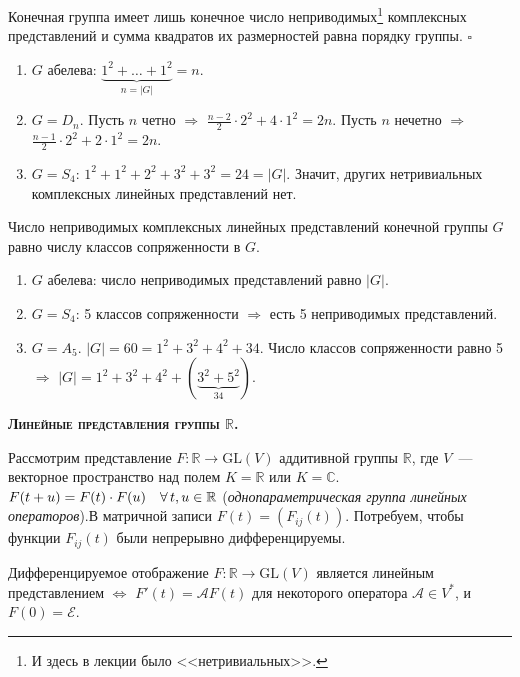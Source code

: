 \documentclass[a4paper]{article}
\newcommand*{\tema}[1]{\vspace{20pt}
\begin{center}{\textbf{\textsc{#1.}}}\vspace{5pt}
\end{center}}
\newcommand*{\p}[1]{#1\nobreak\discretionary{}{\hbox{$\mathsurround=0pt #1$}}{}}
\begin{document}
\begin{sled}
Конечная группа имеет лишь конечное число неп\-риводимых\footnote{И
здесь в лекции было <<нетривиальных>>.} комплексных представлений и
сумма квадратов их размерностей равна порядку группы. $\square$
\end{sled}

\prim
\begin{enumerate}
  \item $G$ абелева: $\underbrace{1^2+\ldots+1^2}_{n=|G|}=n$.
  \item $G=D_n$. Пусть $n$ четно $\Rightarrow$ $\frac{n-2}{2}\cdot 2^2+4\cdot
  1^2=2n$. Пусть $n$ нечетно $\Rightarrow$ $\frac{n-1}{2}\cdot 2^2+2\cdot
  1^2=2n$.
  \item $G=S_4$: $1^2+1^2+2^2+3^2+3^2=24=|G|$. Значит, других
  нетривиальных комплексных линейных представлений нет.
\end{enumerate}

\begin{theorem}
Число неприводимых комплексных линейных представлений конечной
группы $G$ равно числу классов сопряженности в $G$.
\end{theorem}

\prim
\begin{enumerate}
  \item $G$ абелева: число неприводимых представлений равно $|G|$.
  \item $G=S_4$: 5 классов сопряженности $\Rightarrow$ есть 5
  неприводимых представлений.
  \item $G=A_5$. $|G|=60=1^2+3^2+4^2+34$. Число классов
  сопряженности равно 5 $\Rightarrow$
  $|G|=1^2+3^2+4^2+(\underbrace{3^2+5^2}_{34})$.
\end{enumerate}

\tema{Линейные представления группы $\mathbb{R}$}

Рассмотрим представление $F\colon \mathbb{R}\to \mathrm{GL}(V)$
аддитивной группы $\mathbb{R}$, где $V$~--- векторное пространство
над полем $K=\mathbb{R}$ или $K=\mathbb{C}$. $F(t+u)\p=F(t)\cdot
F(u)\quad \forall \, t,u\in\mathbb{R}$ (\emph{однопараметрическая
группа линейных операторов}).В матричной записи $F(t)=(F_{ij}(t))$.
Потребуем, чтобы функции $F_{ij}(t)$ были непрерывно
дифференцируемы.

\begin{theorem}
Дифференцируемое отображение $F\colon \mathbb{R}\to \mathrm{GL}(V)$
является линейным представлением $\Leftrightarrow$
$F'(t)=\mathcal{A}F(t)$ для некоторого оператора $\mathcal{A}\in
V^*$, и $F(0)=\mathcal{E}$.
\end{theorem}
\end{document}
